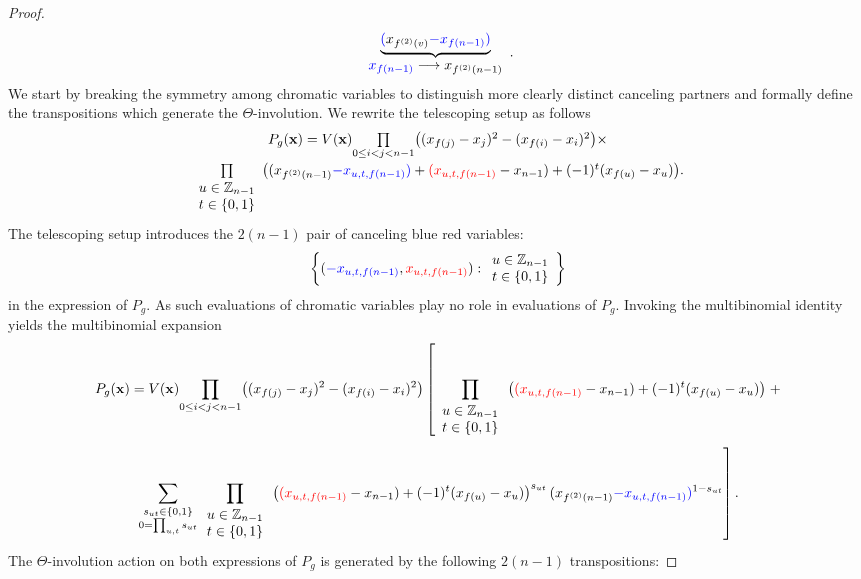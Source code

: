 \begin{proof}
\[\begin{array}{c}
\underbrace{{\color{blue}(}x_{f^{(2)}(v)}{\color{blue}-x_{f(n-1)}}{\color{blue})}}\\
{\color{blue}x_{f(n-1)}}\longrightarrow x_{f^{(2)}(n-1)}
\end{array}.
\]
We start by breaking the symmetry among chromatic variables to distinguish more clearly distinct canceling partners and formally define the transpositions which generate the $\Theta$-involution. We rewrite the telescoping setup as follows
\[
\begin{array}{c}
P_{g}(\mathbf{x})=V(\mathbf{x})\underset{0\le i<j<n-1}{\prod}\big((x_{f(j)}-x_{j})^{2}-(x_{f(i)}-x_{i})^{2}\big)\times\\[10pt]
\underset{\begin{array}{c}
u\in\mathbb{Z}_{n-1}\\
t\in\{0,1\}
\end{array}}{\prod}\big((x_{f^{(2)}(n-1)}{\color{blue}-x_{u,t,f(n-1)}}{\color{blue})}+{\color{red}(x_{u,t,f(n-1)}}-x_{n-1})+(-1)^{t}(x_{f(u)}-x_{u})\big).\\[10pt]
\end{array}
\]
The telescoping setup introduces  the $2(n-1)$ pair of canceling blue red variables:
\[
\bigg\{({\color{blue}-x_{u,t,f(n-1)}},{\color{red}x_{u,t,f(n-1)}}):\begin{array}{c}
u\in\mathbb{Z}_{n-1}\\
t\in\{0,1\}
\end{array}\bigg\}
\]
in the expression of $P_g$.
As such evaluations of chromatic variables play no role in evaluations of $P_{g}$. Invoking the multibinomial identity yields the multibinomial expansion
\[
P_{g}(\mathbf{x})=V(\mathbf{x})\underset{0\le i<j<n-1}{\prod}\big((x_{f(j)}-x_{j})^{2}-(x_{f(i)}-x_{i})^{2}\big)\left[\prod_{\begin{array}{c}
u\in\mathbb{Z}_{n-1}\\
t\in\{0,1\}
\end{array}}\big({\color{red}(x_{u,t,f(n-1)}}-x_{n-1})+(-1)^{t}(x_{f(u)}-x_{u})\big)\right.+
\]
\[
\left.\sum_{\substack{s_{ut}\in\{0,1\}\\
0=\prod_{u,t}s_{ut}
}
}\prod_{\begin{array}{c}
u\in\mathbb{Z}_{n-1}\\
t\in\{0,1\}
\end{array}}\big({\color{red}(x_{u,t,f(n-1)}}-x_{n-1})+(-1)^{t}(x_{f(u)}-x_{u})\big)^{s_{ut}}\,(x_{f^{(2)}(n-1)}{\color{blue}-x_{u,t,f(n-1)}}{\color{blue})}^{1-s_{ut}}\right].
\]
The $\Theta$-involution action on both expressions of $P_{g}$ is generated by the following $2(n-1)$ transpositions:

\end{proof}
